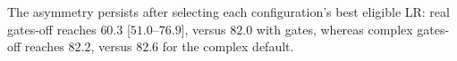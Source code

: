 The asymmetry persists after selecting each configuration’s best eligible LR: real gates-off reaches $60.3$ [$51.0$--$76.9$], versus $82.0$ with gates, whereas complex gates-off reaches $82.2$, versus $82.6$ for the complex default.
